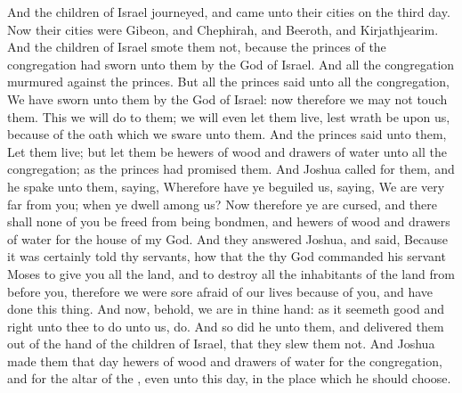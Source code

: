 \begin{biblechapter}
\verse And the children of Israel journeyed, and came unto their cities on the third day. Now their cities were Gibeon, and Chephirah, and Beeroth, and Kirjathjearim.
\verse And the children of Israel smote them not, because the princes of the congregation had sworn unto them by the \LORD God of Israel. And all the congregation murmured against the princes.
\verse But all the princes said unto all the congregation, We have sworn unto them by the \LORD God of Israel: now therefore we may not touch them.
\verse This we will do to them; we will even let them live, lest wrath be upon us, because of the oath which we sware unto them.
\verse And the princes said unto them, Let them live; but let them be hewers of wood and drawers of water unto all the congregation; as the princes had promised them.
\verse And Joshua called for them, and he spake unto them, saying, Wherefore have ye beguiled us, saying, We are very far from you; when ye dwell among us?
\verse Now therefore ye are cursed, and there shall none of you be freed from being bondmen, and hewers of wood and drawers of water for the house of my God.
\verse And they answered Joshua, and said, Because it was certainly told thy servants, how that the \LORD thy God commanded his servant Moses to give you all the land, and to destroy all the inhabitants of the land from before you, therefore we were sore afraid of our lives because of you, and have done this thing.
\verse And now, behold, we are in thine hand: as it seemeth good and right unto thee to do unto us, do.
\verse And so did he unto them, and delivered them out of the hand of the children of Israel, that they slew them not.
\verse And Joshua made them that day hewers of wood and drawers of water for the congregation, and for the altar of the \LORD, even unto this day, in the place which he should choose.
\end{biblechapter}

